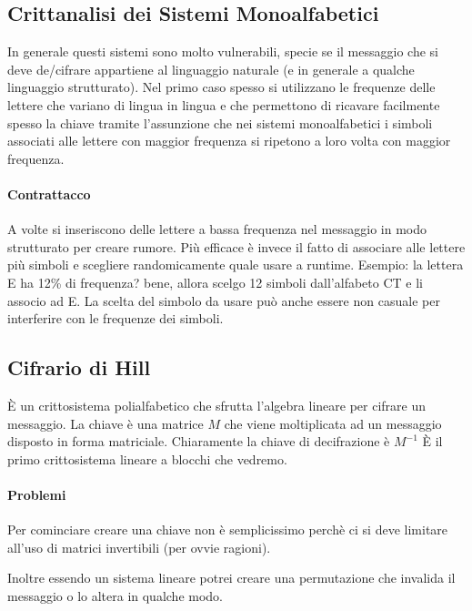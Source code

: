 \subsection{Crittanalisi dei Sistemi Monoalfabetici}

In generale questi sistemi sono molto vulnerabili, specie se il messaggio che si deve de/cifrare appartiene al linguaggio naturale (e in generale a qualche linguaggio strutturato). Nel primo caso spesso si utilizzano le frequenze delle lettere che variano di lingua in lingua e che permettono di ricavare facilmente spesso la chiave tramite l'assunzione che nei sistemi monoalfabetici i simboli associati alle lettere con maggior frequenza si ripetono a loro volta con maggior frequenza.

\paragraph{Contrattacco}

A volte si inseriscono delle lettere a bassa frequenza nel messaggio in modo strutturato per creare rumore. Pi\`u efficace \`e invece il fatto di associare alle lettere pi\`u simboli e scegliere randomicamente quale usare a runtime. Esempio: la lettera E ha 12\% di frequenza? bene, allora scelgo 12 simboli dall'alfabeto CT e li associo ad E. La scelta del simbolo da usare pu\`o anche essere non casuale per interferire con le frequenze dei simboli.

\subsection{Cifrario di Hill}

\`E un crittosistema polialfabetico che sfrutta l'algebra lineare per cifrare un messaggio. La chiave \`e una matrice $M$ che viene moltiplicata ad un messaggio disposto in forma matriciale. Chiaramente la chiave di decifrazione \`e $M^{-1}$
\`E il primo crittosistema lineare a blocchi che vedremo.


\paragraph{Problemi}

Per cominciare creare una chiave non \`e semplicissimo perch\`e ci si deve limitare all'uso di matrici invertibili (per ovvie ragioni).

Inoltre essendo un sistema lineare potrei creare una permutazione che invalida il messaggio o lo altera in qualche modo.

